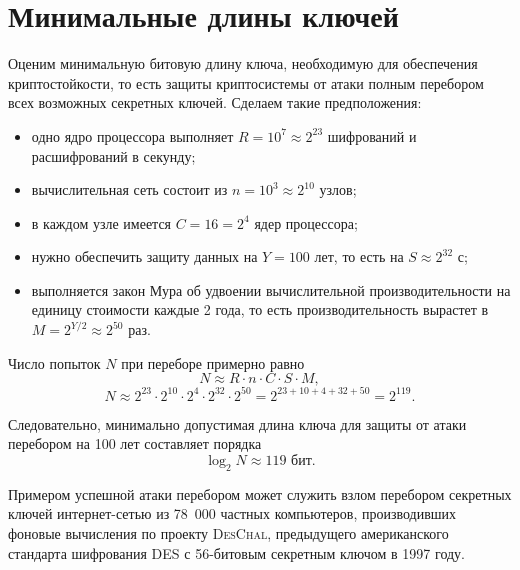 \section{Минимальные длины ключей}

Оценим минимальную битовую длину ключа, необходимую для обеспечения криптостойкости, то есть защиты криптосистемы от атаки полным перебором всех возможных секретных ключей. Сделаем такие предположения:

\begin{itemize}
    \item одно ядро процессора выполняет $R = 10^7 \approx 2^{23}$ шифрований и расшифрований в секунду;
    \item вычислительная сеть состоит из $n = 10^3 \approx 2^{10}$ узлов;
    \item в каждом узле имеется $C = 16 = 2^4$ ядер процессора;
    \item нужно обеспечить защиту данных на $Y = 100$ лет, то есть на $S \approx 2^{32}$ с;
    \item выполняется закон Мура об удвоении вычислительной производительности на единицу стоимости каждые 2 года, то есть производительность вырастет в $M = 2^{Y/2} \approx 2^{50}$ раз.
\end{itemize}

Число попыток $N$ при переборе примерно равно
    \[ N \approx R \cdot n \cdot C \cdot S \cdot M, \]
    \[ N \approx 2^{23} \cdot 2^{10} \cdot 2^{4} \cdot 2^{32} \cdot 2^{50} = 2^{23+10+4+32+50} = 2^{119}. \]

Следовательно, минимально допустимая длина ключа для защиты от атаки перебором на 100 лет составляет порядка
    \[ \log_2 N \approx 119\text{ бит}. \]

Примером успешной атаки перебором может служить взлом перебором секретных ключей интернет-сетью из 78~000 частных компьютеров, производивших фоновые вычисления по проекту \textsc{DesChal}, предыдущего американского стандарта шифрования DES с 56-битовым секретным ключом в 1997 году.
